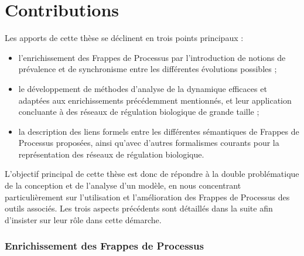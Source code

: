 \section{Contributions}

Les apports de cette thèse se déclinent en trois points principaux :
\begin{itemize}
  \item l'enrichissement des Frappes de Processus par l'introduction de notions
    de prévalence et de synchronisme entre les différentes évolutions possibles ;
  \item le développement de méthodes d'analyse de la dynamique efficaces
    et adaptées aux enrichissements précédemment mentionnés,
    et leur application concluante à des réseaux de régulation biologique de grande taille ;
  \item la description des liens formels entre les différentes sémantiques de Frappes de Processus
    proposées, ainsi qu'avec d'autres formalismes courants pour la représentation
    des réseaux de régulation biologique.
\end{itemize}
L'objectif principal de cette thèse est donc de répondre à la double problématique
de la conception et de l'analyse d'un modèle,
en nous concentrant particulièrement sur l'utilisation et l'amélioration
des Frappes de Processus des outils associés.
Les trois aspects précédents sont détaillés dans la suite
afin d'insister sur leur rôle dans cette démarche.

\subsubsection*{Enrichissement des Frappes de Processus}

